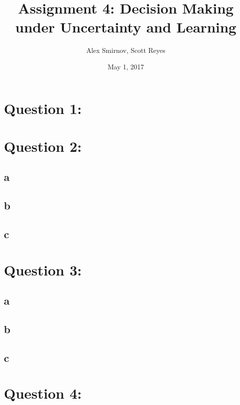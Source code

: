 \documentclass[11pt, oneside]{article}   	%
\title{Assignment 4: Decision Making under Uncertainty and Learning}
\author{Alex Smirnov, Scott Reyes}
\date{May 1, 2017}
\begin{document}
\maketitle
\begin{flushleft}

\section*{Question 1:}

\section*{Question 2:}
\subsection*{a}

\subsection*{b}

\subsection*{c}

\section*{Question 3:}
\subsection*{a}

\subsection*{b}

\subsection*{c}

\section*{Question 4:}

\end{flushleft}
\end{document}
